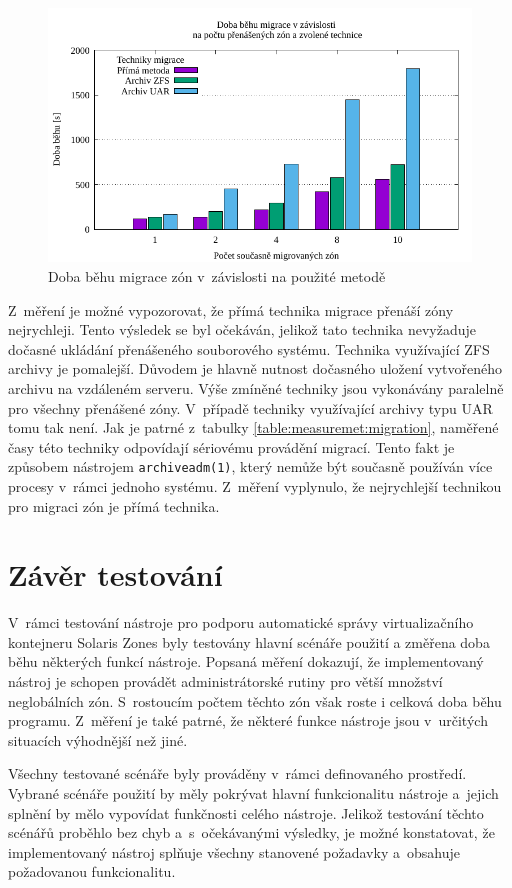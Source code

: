 \begin{figure}
  \centering
  \includegraphics{assets/pdfs/measurement_migration.pdf}
  \caption{Doba běhu migrace zón v~závislosti na použité metodě}
  \label{graph:measuremet:migration}
\end{figure}

Z~měření je možné vypozorovat, že přímá technika migrace přenáší zóny nejrychleji. Tento výsledek se byl očekáván, jelikož tato technika nevyžaduje
dočasné ukládání přenášeného souborového systému. Technika využívající ZFS archivy je pomalejší. Důvodem je hlavně nutnost
dočasného uložení vytvořeného archivu na vzdáleném serveru. Výše zmíněné techniky jsou vykonávány paralelně pro všechny přenášené
zóny. V~případě techniky využívající archivy typu UAR tomu tak není. Jak je patrné z~tabulky \ref{table:measuremet:migration},
naměřené časy této techniky odpovídají sériovému provádění migrací. Tento fakt je způsobem nástrojem \verb|archiveadm(1)|, který
nemůže být současně používán více procesy v~rámci jednoho systému. Z~měření vyplynulo, že nejrychlejší technikou pro migraci zón je
přímá technika.
\section{Závěr testování}
\label{chapter:testing:scenario:conclusion}
V~rámci testování nástroje pro podporu automatické správy virtualizačního kontejneru Solaris Zones byly testovány hlavní scénáře
použití a změřena doba běhu některých funkcí nástroje. Popsaná měření dokazují, že implementovaný nástroj je schopen provádět administrátorské
rutiny pro větší množství neglobálních zón. S~rostoucím počtem těchto zón však roste i celková doba běhu programu. Z~měření je také patrné,
že některé funkce nástroje jsou v~určitých situacích výhodnější než jiné.

Všechny testované scénáře byly prováděny v~rámci definovaného prostředí.
Vybrané scénáře použití by měly pokrývat hlavní funkcionalitu nástroje a~jejich splnění by mělo
vypovídat funkčnosti celého nástroje. Jelikož testování těchto scénářů proběhlo bez chyb a~s~očekávanými výsledky, je možné konstatovat,
že implementovaný nástroj splňuje všechny stanovené požadavky a~obsahuje požadovanou funkcionalitu.

